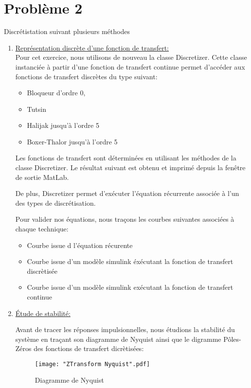 \documentclass[a4paper,12pt,fleqn]{article}
\begin{document}
\section{\textbf{Problème 2}}
Discrétistation suivant plusieurs méthodes
\begin{enumerate}
\item \underline{Représentation discrète d'une fonction de transfert:}\\
Pour cet exercice, nous utilisons de nouveau la classe Discretizer. Cette classe instanciée à partir d'une fonction de transfert continue permet d'accéder aux fonctions de transfert discrètes du type suivant:

\begin{itemize}
  \item Bloqueur d'ordre 0,
  \item Tutsin
  \item Halijak jusqu'à l'ordre 5
  \item Boxer-Thalor jusqu'à l'ordre 5
\end{itemize}

Les fonctions de transfert sont déterminées en utilisant les méthodes de la classe Discretizer. Le résultat suivant est obtenu et imprimé depuis la fenêtre de sortie MatLab.



De plus, Discretizer permet d'exécuter l'équation récurrente associée à l'un des types de discrétisation.

Pour valider nos équations, nous traçons les courbes suivantes associées à chaque technique:

\begin{itemize}
  \item Courbe issue d l'équation récurente
  \item Courbe issue d'un modèle simulink éxécutant la fonction de transfert discrètisée
  \item Courbe issue d'un modèle simulink exécutant la fonction de transfert continue
\end{itemize}

\item \underline{Étude de stabilité:}

Avant de tracer les réponses impulsionnelles, nous étudions la stabilité du système en traçant son diagramme de Nyquist ainsi que le digramme Pôles-Zéros des fonctions de transfert dicrètisées:

\begin{figure}[htb]
  \centering      
    \texttt{[image: "ZTransform Nyquist".pdf]}
	\caption{Diagramme de Nyquist}
\end{figure}
\FloatBarrier


\end{enumerate}
\end{document}
